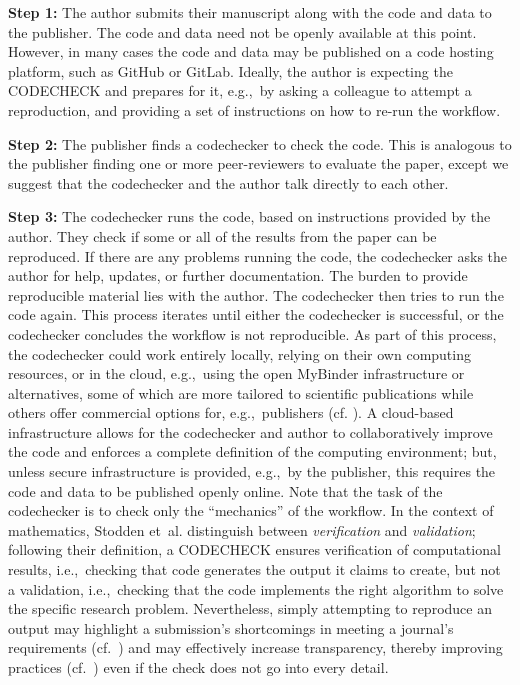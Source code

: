 \documentclass[12pt]{article}
\begin{document}
\textbf{Step 1:} The author submits their manuscript along with the
code and data to the publisher.  The code and data need not be openly
available at this point.  However, in many cases the code and data may
be published on a code hosting platform, such as GitHub or
GitLab. Ideally, the author is expecting the CODECHECK and prepares
for it, e.g.,~by asking a colleague to attempt a reproduction, and
providing a set of instructions on how to re-run the workflow.

\textbf{Step 2:} The publisher finds a codechecker to check the
code. This is analogous to the publisher finding one or more
peer-reviewers to evaluate the paper, except we suggest that the
codechecker and the author talk directly to each other.

\textbf{Step 3:} The codechecker runs the code, based on instructions
provided by the author. They check if some or all of the results from
the paper can be reproduced. If there are any problems running the
code, the codechecker asks the author for help, updates, or further
documentation.  The burden to provide reproducible material lies with
the author.  The codechecker then tries to run the code again.  This
process iterates until either the codechecker is successful, or the
codechecker concludes the workflow is not reproducible.  As part of
this process, the codechecker could work entirely locally, relying on
their own computing resources, or in the cloud, e.g.,~using the open
MyBinder infrastructure \cite{jupyter_binder_2018} or alternatives,
some of which are more tailored to scientific publications while
others offer commercial options for, e.g.,~publishers
(cf. \cite{konkol_publishing_2020}).  A cloud-based infrastructure
allows for the codechecker and author to collaboratively improve the
code and enforces a complete definition of the computing environment;
but, unless secure infrastructure is provided, e.g.,~by the publisher,
this requires the code and data to be published openly online.  Note
that the task of the codechecker is to check only the ``mechanics'' of the
workflow.  In the context of
mathematics, Stodden et~al. \cite{stodden_setting_2013} distinguish
between \emph{verification} and \emph{validation}; following their
definition, a CODECHECK ensures verification
of computational results, i.e.,~checking that code generates the
output it claims to create, but not a validation, i.e.,~checking that
the code implements the right algorithm to solve the specific research
problem.  Nevertheless, simply attempting to reproduce an output may
highlight a submission's shortcomings in meeting a journal's
requirements (cf.~\cite{christian_journal_2020}) and may effectively
increase transparency, thereby improving practices
(cf.~\cite{nosek_scientific_2012}) even if the check does not go into
every detail.
\end{document}
